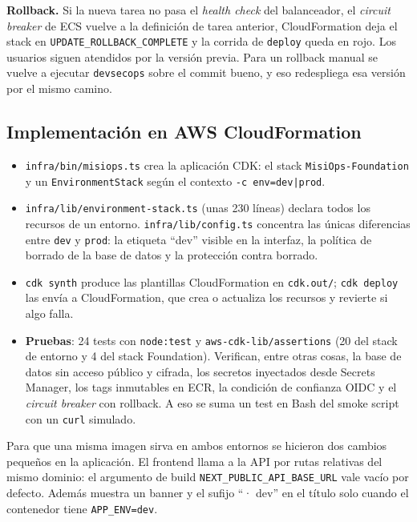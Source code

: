 \textbf{Rollback.} Si la nueva tarea no pasa el \textit{health check} del balanceador, el \textit{circuit breaker} de ECS vuelve a la definición de tarea anterior, CloudFormation deja el stack en \texttt{UPDATE\_ROLLBACK\_COMPLETE} y la corrida de \texttt{deploy} queda en rojo. Los usuarios siguen atendidos por la versión previa. Para un rollback manual se vuelve a ejecutar \texttt{devsecops} sobre el commit bueno, y eso redespliega esa versión por el mismo camino.

\subsection{Implementación en AWS CloudFormation}

\begin{itemize}
    \item \texttt{infra/bin/misiops.ts} crea la aplicación CDK: el stack \texttt{MisiOps-Foundation} y un \texttt{EnvironmentStack} según el contexto \texttt{-c env=dev|prod}.
    \item \texttt{infra/lib/environment-stack.ts} (unas 230 líneas) declara todos los recursos de un entorno. \texttt{infra/lib/config.ts} concentra las únicas diferencias entre \texttt{dev} y \texttt{prod}: la etiqueta ``dev'' visible en la interfaz, la política de borrado de la base de datos y la protección contra borrado.
    \item \texttt{cdk synth} produce las plantillas CloudFormation en \texttt{cdk.out/}; \texttt{cdk deploy} las envía a CloudFormation, que crea o actualiza los recursos y revierte si algo falla.
    \item \textbf{Pruebas}: 24 tests con \texttt{node:test} y \texttt{aws-cdk-lib/assertions} (20 del stack de entorno y 4 del stack Foundation). Verifican, entre otras cosas, la base de datos sin acceso público y cifrada, los secretos inyectados desde Secrets Manager, los tags inmutables en ECR, la condición de confianza OIDC y el \textit{circuit breaker} con rollback. A eso se suma un test en Bash del smoke script con un \texttt{curl} simulado.
\end{itemize}

Para que una misma imagen sirva en ambos entornos se hicieron dos cambios pequeños en la aplicación. El frontend llama a la API por rutas relativas del mismo dominio: el argumento de build \texttt{NEXT\_PUBLIC\_API\_BASE\_URL} vale vacío por defecto. Además muestra un banner y el sufijo ``· dev'' en el título solo cuando el contenedor tiene \texttt{APP\_ENV=dev}.

